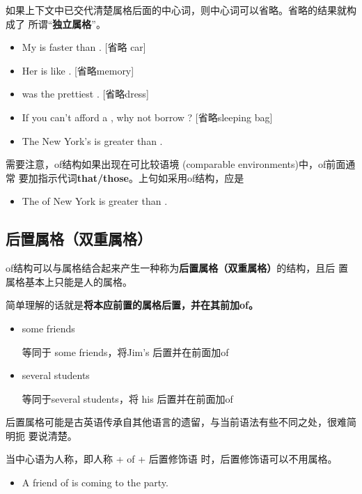 如果上下文中已交代清楚属格后面的中心词，则中心词可以省略。省略的结果就构成了
所谓“\textbf{独立属格}”。
\begin{itemize}
\item  My  is faster than .  [省略 car]
\item  Her  is like . [省略memory]
\item {} was the prettiest . [省略dress]
\item If you can't afford a , why not borrow ? [省略sleeping bag]
\item The New York's  is greater than .
\end{itemize}

需要注意，of结构如果出现在可比较语境 (comparable environments)中，of前面通常
要加指示代词\textbf{that/those}。上句如采用of结构，应是
\begin{itemize}
\item The  of New York is greater than .
\end{itemize}

\subsection{后置属格（双重属格）}

of结构可以与属格结合起来产生一种称为\textbf{后置属格（双重属格）}的结构，且后
置属格基本上只能是人的属格。

简单理解的话就是\textbf{将本应前置的属格后置，并在其前加of。}

\begin{itemize}
\item some friends 

  等同于 some  friends，将Jim's 后置并在前面加of

\item several students 

  等同于several  students，将 his 后置并在前面加of
\end{itemize}

后置属格可能是古英语传承自其他语言的遗留，与当前语法有些不同之处，很难简明扼
要说清楚。

当中心语为人称，即人称 + of + 后置修饰语 时，后置修饰语可以不用属格。
\begin{itemize}
\item A friend of  is coming to the party.
\end{itemize}

